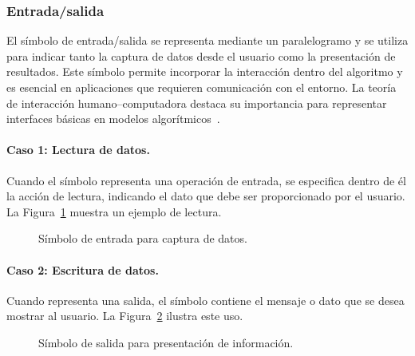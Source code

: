\documentclass[12pt,twoside]{book}
\begin{document}
					\subsubsection{Entrada/salida}
						El símbolo de entrada/salida se representa mediante un paralelogramo y se utiliza para indicar tanto la captura de datos desde el usuario como la presentación de resultados. Este símbolo permite incorporar la interacción dentro del algoritmo y es esencial en aplicaciones que requieren comunicación con el entorno. La teoría de interacción humano–computadora destaca su importancia para representar interfaces básicas en modelos algorítmicos~\cite{Dix2004HCI}.
						
						\paragraph{Caso 1: Lectura de datos.}
						Cuando el símbolo representa una operación de entrada, se especifica dentro de él la acción de lectura, indicando el dato que debe ser proporcionado por el usuario. La Figura~\ref{fig:Entrada} muestra un ejemplo de lectura.
						
						\begin{figure}[hbt!]
							\centering
							\caption{Símbolo de entrada para captura de datos.}
							\label{fig:Entrada}
						\end{figure}
						
						\paragraph{Caso 2: Escritura de datos.}
						Cuando representa una salida, el símbolo contiene el mensaje o dato que se desea mostrar al usuario. La Figura~\ref{fig:Salida} ilustra este uso.
						
						\begin{figure}[hbt!]
							\centering
							\caption{Símbolo de salida para presentación de información.}
							\label{fig:Salida}
						\end{figure}
						
\end{document}
